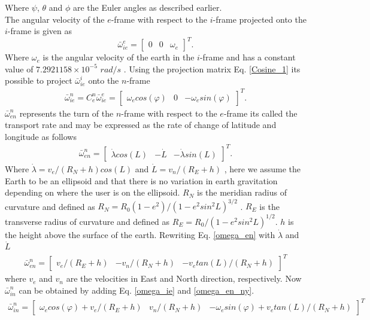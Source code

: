 Where $\psi$, $\theta$ and $\phi$ are the Euler angles as described earlier. \\

The angular velocity of the $e$-frame with respect to the $i$-frame projected onto the $i$-frame is given as \cite{nonlinear}
\begin{equation}
\bar{\omega}_{ie}^e = 
\begin{bmatrix}
0 & 0 & \omega_e
\end{bmatrix}^T.
\end{equation}
Where $\omega_e$ is the angular velocity of the earth in the $i$-frame and has a constant value of
$7.2921158 \times 10^{-5}$ $rad/s$ \cite{nonlinear}. Using the projection matrix Eq. \eqref{Cosine_1} its possible to project $\bar{\omega}_ {ie}^i$ onto the $n$-frame
\begin{align}
\bar{\omega}_{ie}^n=C_e^n\bar{\omega}_{ie}^e=
\begin{bmatrix}
\omega_e cos(\varphi) & 0 & -\omega_e sin(\varphi)
\end{bmatrix}^T.
\label{omega_ie}
\end{align}
$\bar{\omega}_{en}^n$ represents the turn of the $n$-frame with respect to the $e$-frame its called the transport rate and may be expressed as the rate of change of latitude and longitude as follows
\begin{align}
\bar{\omega}_{en}^n=
\begin{bmatrix}
\dot{\lambda}cos(L) & -\dot{L} & -\dot{\lambda}sin(L)
\end{bmatrix}^T.
\label{omega_en}
\end{align}
Where $\dot{\lambda}=v_e/(R_N+h)cos(L)$ and $\dot{L}=v_n/(R_E+h)$ \cite{nonlinear}, here we assume the Earth to be an ellipsoid and that there is no variation in earth gravitation depending on where the user is on the ellipsoid. $R_N$ is the meridian radius of curvature and defined as $R_N=R_0(1-e^2)/(1-e^2sin^2L)^{3/2}$ \cite{nonlinear}. $R_E$ is the transverse radius of curvature and defined as $R_E=R_0/(1-e^2sin^2L)^{1/2}$. $h$ is the height above the surface of the earth. Rewriting Eq. \eqref{omega_en} with $\dot{\lambda}$ and $\dot{L}$
\begin{align}
\bar{\omega}_{en}^n=
\begin{bmatrix}
v_e/(R_E+h) & -v_n/(R_N+h) & -v_e tan(L)/(R_N+h)
\end{bmatrix}^T \label{omega_en_ny}
\end{align}
where $v_e$ and $v_n$ are the velocities in East and North direction, respectively. Now $\bar{\omega}_{in}^n$ can be obtained by adding Eq. \eqref{omega_ie} and \eqref{omega_en_ny}.
\begin{align}
\bar{\omega}_{in}^n=
\begin{bmatrix}
\omega_e cos(\varphi) + v_e/(R_E+h) & v_n/(R_N+h) & -\omega_e sin(\varphi) + v_e tan(L)/(R_N+h)
\end{bmatrix}^T
\label{Eq.omega_in}
\end{align}

